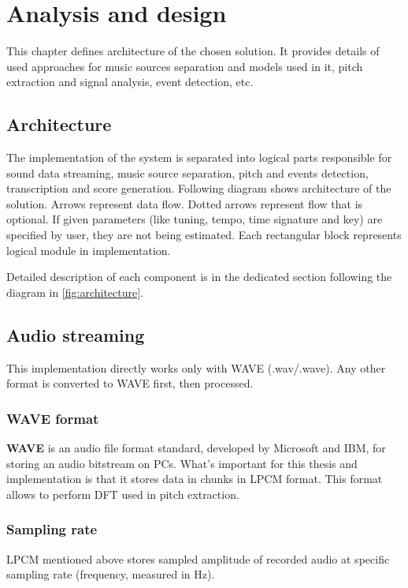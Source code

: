 \chapter{Analysis and design}\label{ch:analysis-and-design}

This chapter defines architecture of the chosen solution. It provides details of used approaches for music sources
separation and models used in it, pitch extraction and signal analysis, event detection, etc.

\section{Architecture}\label{sec:architecture}

The implementation of the system is separated into logical parts responsible for sound data streaming, music source
separation, pitch and events detection, transcription and score generation. Following diagram shows architecture of
the solution. Arrows represent data flow. Dotted arrows represent flow that is optional. If given parameters (like
tuning, tempo, time signature and key) are specified by user, they are not being estimated. Each rectangular block
represents logical module in implementation.

Detailed description of each component is in the dedicated section following the diagram in \cref{fig:architecture}.


\section{Audio streaming}\label{sec:audio-streaming}

This implementation directly works only with \ac{WAVE} (.wav/.wave). Any other format is converted to WAVE first,
then processed.

\subsection{WAVE format}\label{subsec:wave-format}
\textbf{WAVE} is an audio file format standard, developed by Microsoft and IBM, for storing an audio bitstream on PCs.
What's important for this thesis and implementation is that it stores data in chunks in \ac{LPCM} format. This format
allows to perform \ac{DFT} used in pitch extraction.

\subsection{Sampling rate}\label{subsec:sampling-rate}
\ac{LPCM} mentioned above stores sampled amplitude of recorded audio at specific sampling rate (frequency, measured in
Hz).

